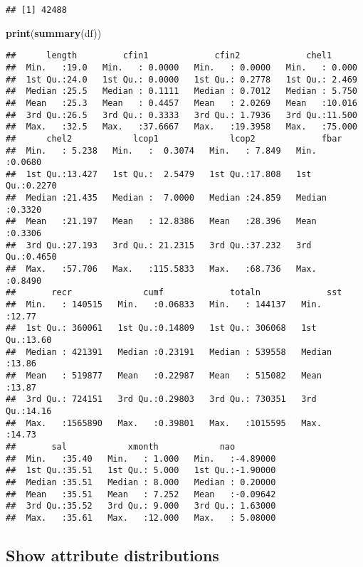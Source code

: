 \documentclass[]{article}
\newenvironment{Shaded}{\begin{snugshade}}{\end{snugshade}}
\newcommand{\KeywordTok}[1]{\textcolor[rgb]{0.13,0.29,0.53}{\textbf{#1}}}
\newcommand{\NormalTok}[1]{#1}
\begin{document}
\begin{verbatim}
## [1] 42488
\end{verbatim}

\begin{Shaded}
\begin{Highlighting}[]
\KeywordTok{print}\NormalTok{(}\KeywordTok{summary}\NormalTok{(df))}
\end{Highlighting}
\end{Shaded}

\begin{verbatim}
##      length         cfin1             cfin2             chel1       
##  Min.   :19.0   Min.   : 0.0000   Min.   : 0.0000   Min.   : 0.000  
##  1st Qu.:24.0   1st Qu.: 0.0000   1st Qu.: 0.2778   1st Qu.: 2.469  
##  Median :25.5   Median : 0.1111   Median : 0.7012   Median : 5.750  
##  Mean   :25.3   Mean   : 0.4457   Mean   : 2.0269   Mean   :10.016  
##  3rd Qu.:26.5   3rd Qu.: 0.3333   3rd Qu.: 1.7936   3rd Qu.:11.500  
##  Max.   :32.5   Max.   :37.6667   Max.   :19.3958   Max.   :75.000  
##      chel2            lcop1              lcop2             fbar       
##  Min.   : 5.238   Min.   :  0.3074   Min.   : 7.849   Min.   :0.0680  
##  1st Qu.:13.427   1st Qu.:  2.5479   1st Qu.:17.808   1st Qu.:0.2270  
##  Median :21.435   Median :  7.0000   Median :24.859   Median :0.3320  
##  Mean   :21.197   Mean   : 12.8386   Mean   :28.396   Mean   :0.3306  
##  3rd Qu.:27.193   3rd Qu.: 21.2315   3rd Qu.:37.232   3rd Qu.:0.4650  
##  Max.   :57.706   Max.   :115.5833   Max.   :68.736   Max.   :0.8490  
##       recr              cumf             totaln             sst       
##  Min.   : 140515   Min.   :0.06833   Min.   : 144137   Min.   :12.77  
##  1st Qu.: 360061   1st Qu.:0.14809   1st Qu.: 306068   1st Qu.:13.60  
##  Median : 421391   Median :0.23191   Median : 539558   Median :13.86  
##  Mean   : 519877   Mean   :0.22987   Mean   : 515082   Mean   :13.87  
##  3rd Qu.: 724151   3rd Qu.:0.29803   3rd Qu.: 730351   3rd Qu.:14.16  
##  Max.   :1565890   Max.   :0.39801   Max.   :1015595   Max.   :14.73  
##       sal            xmonth            nao          
##  Min.   :35.40   Min.   : 1.000   Min.   :-4.89000  
##  1st Qu.:35.51   1st Qu.: 5.000   1st Qu.:-1.90000  
##  Median :35.51   Median : 8.000   Median : 0.20000  
##  Mean   :35.51   Mean   : 7.252   Mean   :-0.09642  
##  3rd Qu.:35.52   3rd Qu.: 9.000   3rd Qu.: 1.63000  
##  Max.   :35.61   Max.   :12.000   Max.   : 5.08000
\end{verbatim}

\hypertarget{show-attribute-distributions}{%
\subsection{Show attribute
distributions}\label{show-attribute-distributions}}
\end{document}

